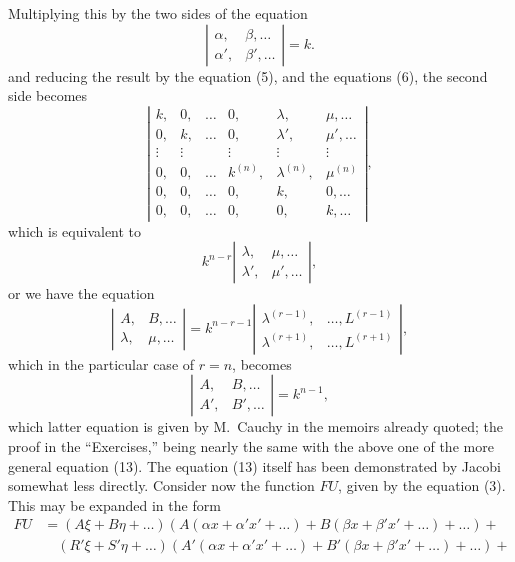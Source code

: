 \documentclass[11pt,a4paper]{book}
\begin{document}
Multiplying this by the two sides of the equation
\[
\left|\begin{array}{cc}
\alpha, & \beta, \ldots \\
\alpha', & \beta', \ldots
\end{array}\right| = k
\tag{10}.
\]
and reducing the result by the equation (5), and the equations (6), the second side
becomes
\[
\left|\begin{array}{cccccc}
k, & 0, & \ldots & 0, & \lambda, & \mu, \ldots \\
0, & k, & \ldots & 0, & \lambda', & \mu', \ldots \\
\vdots & \vdots & & \vdots & \vdots & \vdots \\
0, & 0, & \ldots & k^{(n)}, & \lambda^{(n)}, & \mu^{(n)} \\
0, & 0, & \ldots & 0, & k, & 0, \ldots \\
0, & 0, & \ldots & 0, & 0, & k, \ldots
\end{array}\right|
\tag{11},
\]
which is equivalent to
\[
k^{n-r}\left|\begin{array}{cc}
\lambda, & \mu, \ldots \\
\lambda', & \mu', \ldots
\end{array}\right|
\tag{12},
\]
or we have the equation
\[
\left|\begin{array}{cc}
A, & B, \ldots \\
\lambda, & \mu, \ldots
\end{array}\right| = k^{n-r-1}\left|\begin{array}{cc}
\lambda^{(r-1)}, & \ldots, L^{(r-1)} \\
\lambda^{(r+1)}, & \ldots, L^{(r+1)}
\end{array}\right|
\tag{13},
\]
which in the particular case of $r = n$, becomes
\[
\left|\begin{array}{cc}
A, & B, \ldots \\
A', & B', \ldots
\end{array}\right| = k^{n-1}
\tag{14},
\]
which latter equation is given by M.~Cauchy in the memoirs already quoted; the
proof in the ``Exercises,'' being nearly the same with the above one of the more
general equation (13). The equation (13) itself has been demonstrated by Jacobi
somewhat less directly. Consider now the function $FU$, given by the equation (3).
This may be expanded in the form
\begin{align*}
FU &= (A\xi + B\eta + \ldots)(A(\alpha x + \alpha'x' + \ldots) + B(\beta x + \beta'x' + \ldots) + \ldots) + \tag{15}\\
&\quad (R'\xi + S'\eta + \ldots)(A'(\alpha x + \alpha'x' + \ldots) + B'(\beta x + \beta'x' + \ldots) + \ldots) +
\end{align*}
\end{document}
